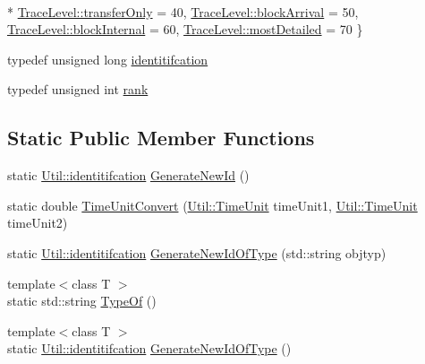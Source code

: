 \begin{DoxyCompactItemize}
\\*
\hyperlink{class_util_a0a3482cfa2d915e261c0cf528fdc7afca0a2e7262b7e0ff948fd4a57e7cb178b6}{Trace\-Level\-::transfer\-Only} = 40, 
\hyperlink{class_util_a0a3482cfa2d915e261c0cf528fdc7afcaa784e286f1dae00f9b31823faa5ee90b}{Trace\-Level\-::block\-Arrival} = 50, 
\hyperlink{class_util_a0a3482cfa2d915e261c0cf528fdc7afca08756a99ac8340cce8bab9de954d738e}{Trace\-Level\-::block\-Internal} = 60, 
\hyperlink{class_util_a0a3482cfa2d915e261c0cf528fdc7afcaac18d2ea075dba67f95df9a907eee741}{Trace\-Level\-::most\-Detailed} = 70
 \}
\item 
typedef unsigned long \hyperlink{class_util_ad17d458d9344b10bba64347e514d6d71}{identitifcation}
\item 
typedef unsigned int \hyperlink{class_util_a2a402b3a3a889d699bb3a1a87cbe6d1e}{rank}
\end{DoxyCompactItemize}
\subsection*{Static Public Member Functions}
\begin{DoxyCompactItemize}
\item 
static \hyperlink{class_util_ad17d458d9344b10bba64347e514d6d71}{Util\-::identitifcation} \hyperlink{class_util_a59ecba8027c38a9d0a3a0e9e9dc94ad7}{Generate\-New\-Id} ()
\item 
static double \hyperlink{class_util_a5f537febaa83db4721745a4730657bab}{Time\-Unit\-Convert} (\hyperlink{class_util_a28504cc2fecc9aa47154cba4e625ec6f}{Util\-::\-Time\-Unit} time\-Unit1, \hyperlink{class_util_a28504cc2fecc9aa47154cba4e625ec6f}{Util\-::\-Time\-Unit} time\-Unit2)
\item 
static \hyperlink{class_util_ad17d458d9344b10bba64347e514d6d71}{Util\-::identitifcation} \hyperlink{class_util_a96dd76236d7f5888b8dac562e93f9278}{Generate\-New\-Id\-Of\-Type} (std\-::string objtyp)
\item 
{\footnotesize template$<$class T $>$ }\\static std\-::string \hyperlink{class_util_a1010d1207367e48e1d417381f32abf1f}{Type\-Of} ()
\item 
{\footnotesize template$<$class T $>$ }\\static \hyperlink{class_util_ad17d458d9344b10bba64347e514d6d71}{Util\-::identitifcation} \hyperlink{class_util_aec5f31f4f467113c25a6aef7bb5f4a40}{Generate\-New\-Id\-Of\-Type} ()
\end{DoxyCompactItemize}
